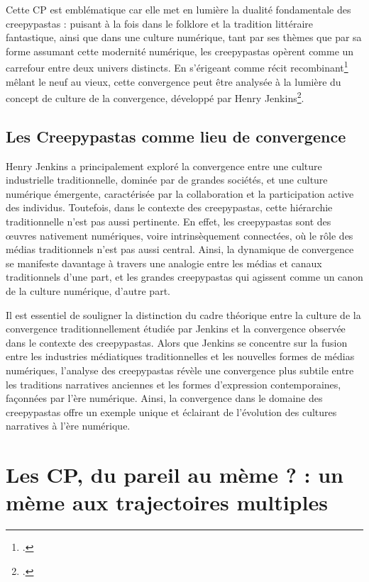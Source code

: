 \documentclass[12pt,a4paper,oneside,titlepage]{book} %
\begin{document}
Cette CP est emblématique car elle met en lumière la dualité fondamentale des creepypastas : puisant à la fois dans le folklore et la tradition littéraire fantastique, ainsi que dans une culture numérique, tant par ses thèmes que par sa forme assumant cette modernité numérique, les creepypastas opèrent comme un carrefour entre deux univers distincts. En s'érigeant comme récit recombinant\footcite{jacobs_character_1990} mêlant le neuf au vieux, cette convergence peut être analysée à la lumière du concept de culture de la convergence, développé par Henry Jenkins\footcite{jenkins_convergence_2006}.

\section{Les Creepypastas comme lieu de convergence}

Henry Jenkins a principalement exploré la convergence entre une culture industrielle traditionnelle, dominée par de grandes sociétés, et une culture numérique émergente, caractérisée par la collaboration et la participation active des individus. Toutefois, dans le contexte des creepypastas, cette hiérarchie traditionnelle n'est pas aussi pertinente. En effet, les creepypastas sont des œuvres nativement numériques, voire intrinsèquement connectées, où le rôle des médias traditionnels n'est pas aussi central. Ainsi, la dynamique de convergence se manifeste davantage à travers une analogie entre les médias et canaux traditionnels d'une part, et les grandes creepypastas qui agissent comme un canon de la culture numérique, d'autre part.

Il est essentiel de souligner la distinction du cadre théorique entre la culture de la convergence traditionnellement étudiée par Jenkins et la convergence observée dans le contexte des creepypastas. Alors que Jenkins se concentre sur la fusion entre les industries médiatiques traditionnelles et les nouvelles formes de médias numériques, l'analyse des creepypastas révèle une convergence plus subtile entre les traditions narratives anciennes et les formes d'expression contemporaines, façonnées par l'ère numérique. Ainsi, la convergence dans le domaine des creepypastas offre un exemple unique et éclairant de l'évolution des cultures narratives à l'ère numérique.


\chapter[Les CP : du pareil au mème ? ]{Les CP, du pareil au mème ?  :  un mème aux trajectoires multiples}
\end{document}
